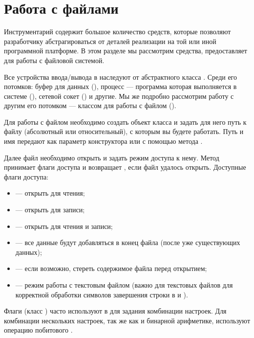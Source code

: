 \section[Работа с файлами]{Работа с файлами}
Инструментарий  содержит большое количество средств, которые позволяют разработчику абстрагироваться от
деталей реализации на той или иной программной платформе. В этом разделе мы рассмотрим средства,  предоставляет для
работы с файловой системой.

Все устройства ввода/вывода в  наследуют от абстрактного класса
. Среди его потомков: буфер для данных
(), процесс --- программа которая выполняется в системе (),
сетевой сокет () и другие. Мы же подробно рассмотрим работу с
другим его потомком --- классом для работы с файлом ().

Для работы с файлом необходимо создать объект класса  и задать для него
путь к файлу (абсолютный или относительный), с которым вы будете работать. Путь и имя передают как параметр
конструктора или с помощью метода .

Далее файл необходимо открыть и задать режим доступа к нему. Метод 
принимает флаги доступа и возвращает , если
файл удалось открыть. Доступные флаги доступа:
\begin{itemize}
\item {} --- открыть для чтения;
\item {} --- открыть для записи;
\item {} --- открыть для чтения и записи;
\item {} --- все данные будут добавляться в конец файла (после уже существующих
данных);
\item {} --- если возможно, стереть содержимое файла перед открытием;
\item {} --- режим работы с текстовым файлом (важно для
текстовых файлов для корректной обработки символов завершения строки в  и ).
\end{itemize}

Флаги (класс ) часто используют в  для
задания комбинации настроек. Для комбинации нескольких настроек, так же как и бинарной арифметике, используют операцию
побитового .

